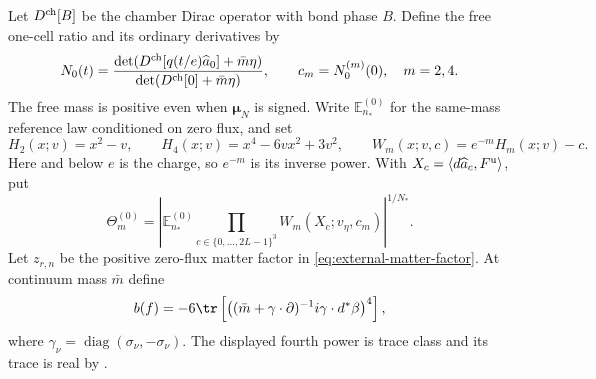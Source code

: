 Let $D^{\rm ch}[B]$ be the chamber Dirac operator with bond
phase $B$. Define the free one-cell ratio and its ordinary
derivatives by
\begin{equation}\label{eq:response-coefficient-relations}
 N_0(t)=\frac{\det(D^{\rm ch}[q(t/e)\widehat a_0]+\bar m\eta)}
                    {\det(D^{\rm ch}[0]+\bar m\eta)},\qquad
 c_m=N_0^{(m)}(0),\quad m=2,4.
\end{equation}
The free mass is positive even when $\boldsymbol\mu_N$ is signed.
Write $\mathbb E^{(0)}_{n_*}$ for the same-mass reference law
conditioned on zero flux, and set
\begin{equation}\label{eq:vtm-Wick}
 H_2(x;v)=x^2-v,\qquad H_4(x;v)=x^4-6vx^2+3v^2,\qquad
 W_m(x;v,c)=e^{-m}H_m(x;v)-c.
\end{equation}
Here and below $e$ is the charge, so $e^{-m}$ is its inverse
power. With $X_c=\langle d\widehat a_c,F^{\rm u}\rangle$, put
\begin{equation}\label{eq:vtm-reference-root}
 \Theta_m^{(0)}
 =\left|\mathbb E_{n_*}^{(0)}
       \prod_{c\in\{0,\ldots,2L-1\}^3}W_m(X_c;v_\eta,c_m)
   \right|^{1/N_*}.
\end{equation}
Let $z_{r,n}$ be the positive zero-flux matter factor in
\eqref{eq:external-matter-factor}. At continuum mass $\bar m$ define
\[
 b(f)=-6\tr\left[
    \bigl((\bar m+\gamma\cdot\partial)^{-1}i\gamma\cdot d^*\beta
                 \bigr)^4\right],
\]
where $\gamma_\nu=\operatorname{diag}(\sigma_\nu,-\sigma_\nu)$.
The displayed fourth power is trace class and its trace is real
by \cite[Theorem~A]{PositiveProbe}.

